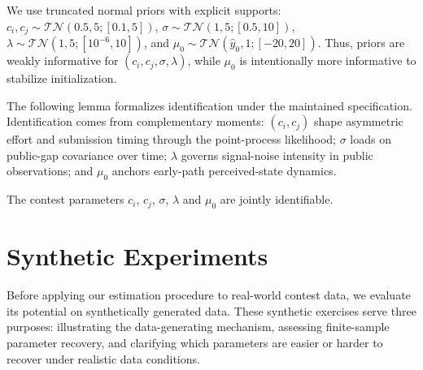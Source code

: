 \documentclass[mnsc]{informs3}
\begin{document}
We use truncated normal priors with explicit supports:
$c_i,c_j\sim\mathcal{TN}(0.5,5;[0.1,5])$,
$\sigma\sim\mathcal{TN}(1,5;[0.5,10])$,
$\lambda\sim\mathcal{TN}(1,5;[10^{-6},10])$,
and $\mu_0\sim\mathcal{TN}(\hat{y}_0,1;[-20,20])$.
Thus, priors are weakly informative for $(c_i,c_j,\sigma,\lambda)$, while $\mu_0$ is intentionally more informative to stabilize initialization.


The following lemma formalizes identification under the maintained specification.
Identification comes from complementary moments: $(c_i,c_j)$ shape asymmetric effort and submission timing through the point-process likelihood; $\sigma$ loads on public-gap covariance over time; $\lambda$ governs signal-noise intensity in public observations; and $\mu_0$ anchors early-path perceived-state dynamics.

\begin{lemma}\label{lmm-params-identifiability}
The contest parameters $c_i$, $c_j$, $\sigma$, $\lambda$ and $\mu_0$ are jointly identifiable.
\end{lemma}




\section{Synthetic Experiments}\label{sect-synthetic}

Before applying our estimation procedure to real-world contest data, we evaluate its potential on synthetically generated data.
These synthetic exercises serve three purposes: illustrating the data-generating mechanism, assessing finite-sample parameter recovery, and clarifying which parameters are easier or harder to recover under realistic data conditions.
\end{document}

